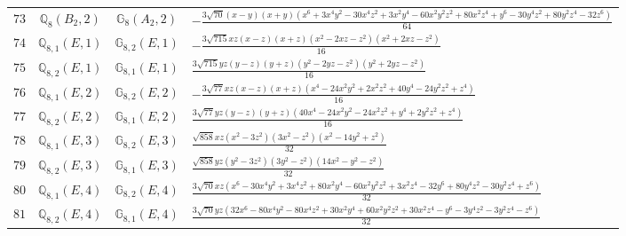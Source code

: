 \documentclass[fleqn,8pt,landscape]{jsarticle}
\begin{document}
\begin{table}[ht!]
\begin{center}
\begin{tabular}{cccl}
$ 73 $ & $ \mathbb{Q}_{8}(B_{2},2) $ & $ \mathbb{G}_{8}(A_{2},2) $ & $ - \frac{3 \sqrt{70} \left(x - y\right) \left(x + y\right) \left(x^{6} + 3 x^{4} y^{2} - 30 x^{4} z^{2} + 3 x^{2} y^{4} - 60 x^{2} y^{2} z^{2} + 80 x^{2} z^{4} + y^{6} - 30 y^{4} z^{2} + 80 y^{2} z^{4} - 32 z^{6}\right)}{64} $ \\
$ 74 $ & $ \mathbb{Q}_{8,1}(E,1) $ & $ \mathbb{G}_{8,2}(E,1) $ & $ - \frac{3 \sqrt{715} x z \left(x - z\right) \left(x + z\right) \left(x^{2} - 2 x z - z^{2}\right) \left(x^{2} + 2 x z - z^{2}\right)}{16} $ \\
$ 75 $ & $ \mathbb{Q}_{8,2}(E,1) $ & $ \mathbb{G}_{8,1}(E,1) $ & $ \frac{3 \sqrt{715} y z \left(y - z\right) \left(y + z\right) \left(y^{2} - 2 y z - z^{2}\right) \left(y^{2} + 2 y z - z^{2}\right)}{16} $ \\
$ 76 $ & $ \mathbb{Q}_{8,1}(E,2) $ & $ \mathbb{G}_{8,2}(E,2) $ & $ - \frac{3 \sqrt{77} x z \left(x - z\right) \left(x + z\right) \left(x^{4} - 24 x^{2} y^{2} + 2 x^{2} z^{2} + 40 y^{4} - 24 y^{2} z^{2} + z^{4}\right)}{16} $ \\
$ 77 $ & $ \mathbb{Q}_{8,2}(E,2) $ & $ \mathbb{G}_{8,1}(E,2) $ & $ \frac{3 \sqrt{77} y z \left(y - z\right) \left(y + z\right) \left(40 x^{4} - 24 x^{2} y^{2} - 24 x^{2} z^{2} + y^{4} + 2 y^{2} z^{2} + z^{4}\right)}{16} $ \\
$ 78 $ & $ \mathbb{Q}_{8,1}(E,3) $ & $ \mathbb{G}_{8,2}(E,3) $ & $ \frac{\sqrt{858} x z \left(x^{2} - 3 z^{2}\right) \left(3 x^{2} - z^{2}\right) \left(x^{2} - 14 y^{2} + z^{2}\right)}{32} $ \\
$ 79 $ & $ \mathbb{Q}_{8,2}(E,3) $ & $ \mathbb{G}_{8,1}(E,3) $ & $ \frac{\sqrt{858} y z \left(y^{2} - 3 z^{2}\right) \left(3 y^{2} - z^{2}\right) \left(14 x^{2} - y^{2} - z^{2}\right)}{32} $ \\
$ 80 $ & $ \mathbb{Q}_{8,1}(E,4) $ & $ \mathbb{G}_{8,2}(E,4) $ & $ \frac{3 \sqrt{70} x z \left(x^{6} - 30 x^{4} y^{2} + 3 x^{4} z^{2} + 80 x^{2} y^{4} - 60 x^{2} y^{2} z^{2} + 3 x^{2} z^{4} - 32 y^{6} + 80 y^{4} z^{2} - 30 y^{2} z^{4} + z^{6}\right)}{32} $ \\
$ 81 $ & $ \mathbb{Q}_{8,2}(E,4) $ & $ \mathbb{G}_{8,1}(E,4) $ & $ \frac{3 \sqrt{70} y z \left(32 x^{6} - 80 x^{4} y^{2} - 80 x^{4} z^{2} + 30 x^{2} y^{4} + 60 x^{2} y^{2} z^{2} + 30 x^{2} z^{4} - y^{6} - 3 y^{4} z^{2} - 3 y^{2} z^{4} - z^{6}\right)}{32} $ \\
 \hline \hline
\end{tabular}
\end{center}
\end{table}
\end{document}
